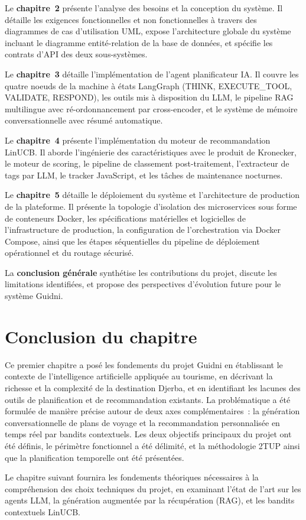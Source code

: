 Le \textbf{chapitre~2} présente l'analyse des besoins et la conception du système. Il détaille les
exigences fonctionnelles et non fonctionnelles à travers des diagrammes de cas d'utilisation UML,
expose l'architecture globale du système incluant le diagramme entité-relation de la base de
données, et spécifie les contrats d'API des deux sous-systèmes.

Le \textbf{chapitre~3} détaille l'implémentation de l'agent planificateur IA. Il couvre les quatre
noeuds de la machine à états LangGraph (THINK, EXECUTE\_TOOL, VALIDATE, RESPOND), les 
outils mis à disposition du LLM, le pipeline RAG multilingue avec ré-ordonnancement par
cross-encoder, et le système de mémoire conversationnelle avec résumé automatique.

Le \textbf{chapitre~4} présente l'implémentation du moteur de recommandation LinUCB. Il aborde
l'ingénierie des caractéristiques avec le produit de Kronecker, le moteur de scoring, le pipeline
de classement post-traitement, l'extracteur de tags par LLM, le tracker JavaScript, et les tâches
de maintenance nocturnes.

Le \textbf{chapitre~5} détaille le déploiement du système et l'architecture de production de la plateforme.
Il présente la topologie d'isolation des microservices sous forme de conteneurs Docker, les spécifications matérielles et logicielles de l'infrastructure de production, la configuration de l'orchestration via Docker Compose, ainsi que les étapes séquentielles du pipeline de déploiement opérationnel et du routage sécurisé.

La \textbf{conclusion générale} synthétise les contributions du projet, discute les limitations
identifiées, et propose des perspectives d'évolution future pour le système Guidni.


\section*{Conclusion du chapitre}

Ce premier chapitre a posé les fondements du projet Guidni en établissant le contexte de
l'intelligence artificielle appliquée au tourisme, en décrivant la richesse et la complexité de la
destination Djerba, et en identifiant les lacunes des outils de planification et de recommandation
existants. La problématique a été formulée de manière précise autour de deux axes
complémentaires~: la génération conversationnelle de plans de voyage et la recommandation
personnalisée en temps réel par bandits contextuels. Les deux objectifs principaux du projet ont été définis,
le périmètre fonctionnel a été délimité, et la méthodologie 2TUP ainsi que la planification
temporelle ont été présentées.

Le chapitre suivant fournira les fondements théoriques nécessaires à la compréhension des choix
techniques du projet, en examinant l'état de l'art sur les agents LLM, la génération augmentée
par la récupération (RAG), et les bandits contextuels LinUCB.
